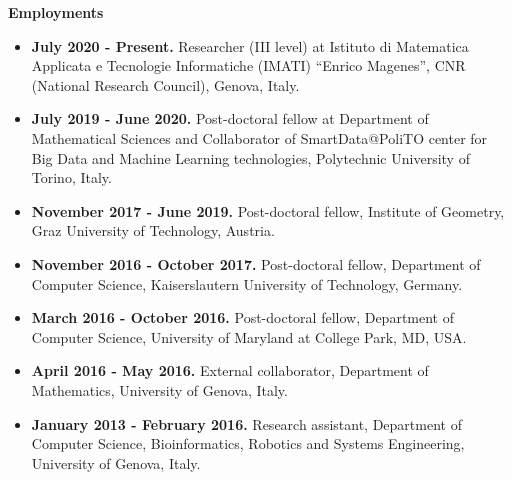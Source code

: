 \documentclass[11pt]{article}
\begin{document}
\vspace*{2.5ex}

\noindent
{\Large\bf Employments}

\begin{itemize}

\item {\bf July 2020 - Present.} Researcher (III level) at Istituto di Matematica Applicata e Tecnologie Informatiche (IMATI) ``Enrico Magenes'', CNR (National Research Council), Genova, Italy.

\item {\bf July 2019 - June 2020.} Post-doctoral fellow at Department of Mathematical Sciences
and Collaborator of SmartData@PoliTO center for Big Data and Machine Learning technologies, Polytechnic University of Torino, Italy.

\item {\bf November 2017 - June 2019.} Post-doctoral fellow, Institute of Geometry, Graz University of Technology, Austria.

\item {\bf November 2016 - October 2017.} Post-doctoral fellow, Department of Computer Science, Kaiserslautern University of Technology, Germany.


\item {\bf March 2016 - October 2016.} Post-doctoral fellow, Department of Computer Science, University of Maryland at College Park, MD, USA.

\item {\bf April 2016 - May 2016.} External collaborator, Department of Mathematics, University of Genova, Italy.

\item {\bf January 2013 - February 2016.} Research assistant, Department of Computer Science, Bioinformatics, Robotics and Systems Engineering, University of Genova, Italy.

\end{itemize}



\vspace*{3ex}
\end{document}
